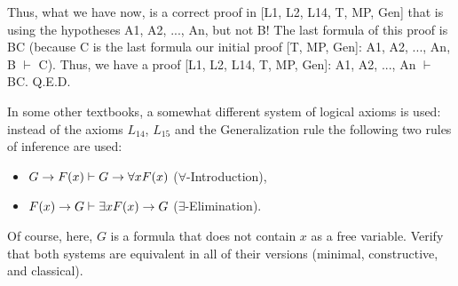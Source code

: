 Thus, what we have now, is a correct proof in [L1, L2, L14, T, MP, Gen] that is using the hypotheses A1,
A2, ..., An, but not B! The last formula of this proof is B\IMPLIES C (because C is the last formula our initial
proof [T, MP, Gen]: A1, A2, ..., An, B \(\vdash\) C). Thus, we have a proof [L1, L2, L14, T, MP, Gen]: A1, A2, ...,
An \(\vdash\) B\IMPLIES C. Q.E.D.

\begin{exercise}
In some other textbooks, a somewhat different system of logical axioms is used: instead of the axioms \(L_{14}\), \(L_{15}\) and the Generalization rule the following two rules of inference are used:
\begin{itemize}
    \item \(G\rightarrow F(x) \vdash G\rightarrow \forall xF(x)\) (\(\forall\)-Introduction),
    \item \(F(x)\rightarrow G \vdash \exists xF(x)\rightarrow G\) (\(\exists\)-Elimination).
\end{itemize}
Of course, here, \(G\) is a formula that does not contain \(x\) as a free variable. Verify that both systems are
equivalent in all of their versions (minimal, constructive, and classical).
\end{exercise}

